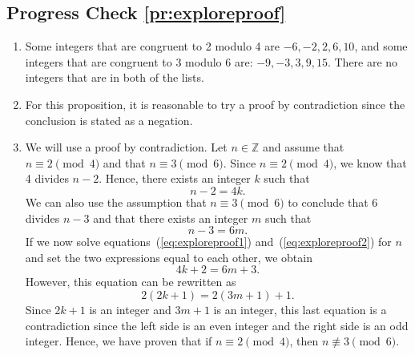 \subsection*{Progress Check \ref{pr:exploreproof}}
\begin{enumerate}
\item Some integers that are congruent to  2  modulo  4 are  $-6, -2, 2, 6, 10$, and some integers that are congruent to  3  modulo  6 are:  $-9, -3, 3, 9, 15$.  There are no integers that are in both of the lists.

\item For this proposition, it is reasonable to try a proof by contradiction since the conclusion is stated as a negation.

\item 
\begin{myproof}
\setcounter{equation}{0}
We will use a proof by contradiction.  Let  $n \in \mathbb{Z}$ and assume that  
$n \equiv 2 \pmod 4$ and that $n \equiv 3 \pmod 6$.  Since  $n \equiv 2 \pmod 4$, we know that  4  divides  $n - 2$.  Hence, there exists an integer  $k$  such that
\begin{equation} \label{eq:exploreproof1}
n - 2 = 4k.
\end{equation}
%
We can also use the assumption that  $n \equiv 3 \pmod 6$ to conclude that  6  divides  $n - 3$
 and that there exists an integer  $m$  such that
\begin{equation} \label{eq:exploreproof2}
n - 3 = 6m.
\end{equation}
%
If we now solve equations~(\ref{eq:exploreproof1})  and~(\ref{eq:exploreproof2})  for  $n$  and set the two expressions equal to each other, we obtain
\[
4k + 2 = 6m + 3.
\]
However, this equation can be rewritten as
\[
2\left( {2k + 1} \right) = 2\left( {3m + 1} \right) + 1.
\]
Since  $2k + 1$ is an integer and  $3m + 1$ is an integer, this last equation is a contradiction since the left side is an even integer and the right side is an odd integer.  Hence, we have proven that if  $n \equiv 2 \pmod 4$, then  $n\not  \equiv 3 \pmod 6$.
\end{myproof}
\end{enumerate}



